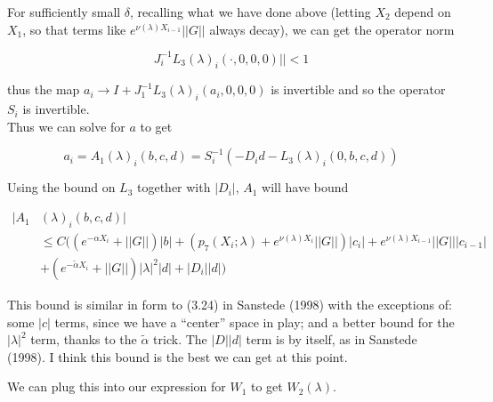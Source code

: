 \documentclass[12pt]{article}
\begin{document}
For sufficiently small $\delta$, recalling what we have done above (letting $X_2$ depend on $X_1$, so that terms like $e^{\nu(\lambda)X_{i-1}} ||G||$ always decay), we can get the operator norm 

\[
J_i^{-1} L_3(\lambda)_i(\cdot, 0, 0, 0)|| < 1
\]

thus the map $a_i \rightarrow I + J_1^{-1} L_3(\lambda)_i(a_i, 0, 0, 0)$ is invertible and so the operator $S_i$ is invertible.\\

Thus we can solve for $a$ to get

\[
a_i = A_1(\lambda)_i(b, c, d) = S_i^{-1}(-D_i d - L_3(\lambda)_i(0, b, c, d))
\]

Using the bound on $L_3$ together with $|D_i|$, $A_1$ will have bound

\begin{align*}
|A_1&(\lambda)_i(b, c, d)| \\
&\leq C \Big( (e^{-\alpha X_i} + ||G||) |b| 
+ ( p_7(X_i; \lambda) + e^{\nu(\lambda)X_i} ||G||) |c_i| + e^{\nu(\lambda)X_{i-1}} ||G|| |c_{i-1}| \\
&+ (e^{-\tilde{\alpha} X_i} + ||G||) |\lambda|^2 |d| + |D_i||d| \Big)
\end{align*} 

This bound is similar in form to (3.24) in Sanstede (1998) with the exceptions of: some $|c|$ terms, since we have a ``center'' space in play; and a better bound for the $|\lambda|^2$ term, thanks to the $\tilde{\alpha}$ trick. The $|D| |d| $ term is by itself, as in Sanstede (1998). I think this bound is the best we can get at this point.

We can plug this into our expression for $W_1$ to get $W_2(\lambda)$.
\end{document}
